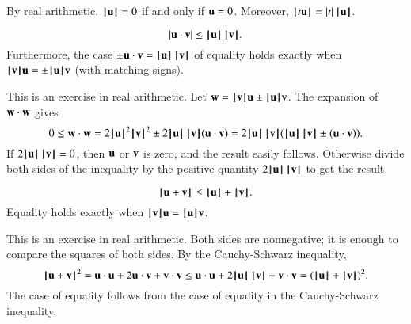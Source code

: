By  real arithmetic,
$\normo{\u}=0$  if and only if $\u=0$.  Moreover,
$\normo{ t \u } = |t| \, \normo{\u}$.   



\begin{lemma}
    $$|\u \cdot \v| \le \normo{\u}\,\normo{\v}.$$
Furthermore, the case
$\pm \u\cdot \v = \normo{\u}\,\normo{\v}$  of equality holds exactly when $\normo{\v} \u = \pm\normo{\u} \v$ (with matching signs).
\end{lemma}
%

\begin{proved}
This is an exercise in real arithmetic.
   Let $\w = \normo{\v} \u \pm \normo{\u} \v$.  The expansion of $\w\cdot \w$ gives
    $$0\le \w\cdot \w = 2\normo{\u}^2\normo{\v}^2 \pm 2\normo{\u}\, \normo{\v} (\u\cdot \v) =
    2\normo{\u}\,
    \normo{\v} (\normo{\u}\, \normo{\v} \pm (\u \cdot \v)).$$
    If $2\normo{\u} \,\normo{\v} = 0$, then $\u$ or $\v$ is zero, and the result
    easily follows.  Otherwise divide both sides of the inequality
    by the positive quantity $2 \normo{\u} \,\normo{\v}$ to get the result.
\swallowed\end{proved}

\begin{lemma}\label{lemma:triangle}
  $$
  \normo{\u + \v} \le \normo{\u} + \normo{\v }.
  $$
Equality holds exactly when $\normo{\v}\u = \normo{\u}\v$.
\end{lemma}
%

\begin{proved}  This is an exercise in real arithmetic.
Both sides are nonnegative; it is enough to compare the squares of
both sides.  By the Cauchy-Schwarz inequality,
    $$\normo{\u + \v}^2 = \u\cdot \u + 2 \u\cdot \v + \v\cdot \v \le
      \u\cdot \u + 2 \normo{ \u}\,\normo{\v} + \v\cdot \v = (\normo{\u}+\normo{\v})^2.
    $$
The case of equality follows from the case of equality in the
Cauchy-Schwarz inequality.
\swallowed\end{proved}



